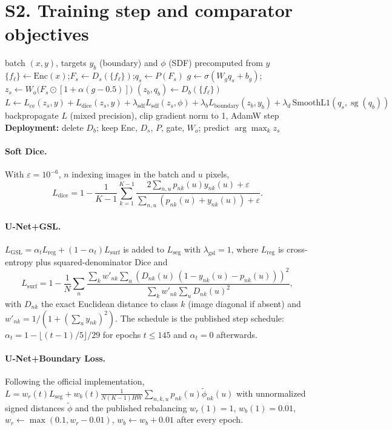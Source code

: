 \documentclass[10pt]{article}
\newcommand{\sg}{\operatorname{sg}}
\begin{document}
\section*{S2. Training step and comparator objectives}
\begin{algorithm}[ht]
\caption{BDS-Lite training step and deployment}
\begin{algorithmic}[1]
\Require batch $(x,y)$, targets $y_b$ (boundary) and $\phi$ (SDF) precomputed from $y$
\State $\{f_\ell\}\gets\mathrm{Enc}(x)$;\quad $F_s\gets D_s(\{f_\ell\})$;\quad $q_s\gets P(F_s)$
\State $g\gets\sigma(W_gq_s+b_g)$;\quad $z_s\gets W_o\bigl(F_s\odot[1+\alpha(g-0.5)]\bigr)$
\State $(z_b,q_b)\gets D_b(\{f_\ell\})$ 
\State $L\gets L_{\mathrm{ce}}(z_s,y)+L_{\mathrm{dice}}(z_s,y)+\lambda_{\mathrm{sdf}}L_{\mathrm{sdf}}(z_s,\phi)+\lambda_bL_{\mathrm{boundary}}(z_b,y_b)+\lambda_d\,\mathrm{SmoothL1}(q_s,\sg(q_b))$
\State backpropagate $L$ (mixed precision), clip gradient norm to 1, AdamW step
\State \textbf{Deployment:} delete $D_b$; keep Enc, $D_s$, $P$, gate, $W_o$; predict $\arg\max_k z_s$
\end{algorithmic}
\end{algorithm}

\paragraph{Soft Dice.} With $\varepsilon=10^{-6}$, $n$ indexing images in the batch and $u$ pixels,
\[
L_{\mathrm{dice}}=1-\frac{1}{K-1}\sum_{k=1}^{K-1}\frac{2\sum_{n,u}p_{nk}(u)y_{nk}(u)+\varepsilon}{\sum_{n,u}\left(p_{nk}(u)+y_{nk}(u)\right)+\varepsilon}.
\]

\paragraph{U-Net+GSL.} $L_{\mathrm{GSL}}=\alpha_tL_{\mathrm{reg}}+(1-\alpha_t)L_{\mathrm{surf}}$ is added to $L_{\mathrm{seg}}$ with $\lambda_{\mathrm{gsl}}=1$, where $L_{\mathrm{reg}}$ is cross-entropy plus squared-denominator Dice and
\[
L_{\mathrm{surf}}=1-\frac1N\sum_n\frac{\sum_kw'_{nk}\sum_u\left(D_{nk}(u)\,(1-y_{nk}(u)-p_{nk}(u))\right)^2}{\sum_kw'_{nk}\sum_uD_{nk}(u)^2},
\]
with $D_{nk}$ the exact Euclidean distance to class $k$ (image diagonal if absent) and $w'_{nk}=1/(1+(\sum_uy_{nk})^2)$. The schedule is the published step schedule: $\alpha_t=1-\lfloor(t-1)/5\rfloor/29$ for epochs $t\le145$ and $\alpha_t=0$ afterwards.

\paragraph{U-Net+Boundary Loss.} Following the official implementation, $L=w_r(t)L_{\mathrm{seg}}+w_b(t)\frac{1}{N(K-1)HW}\sum_{n,k,u}p_{nk}(u)\tilde\phi_{nk}(u)$ with unnormalized signed distances $\tilde\phi$ and the published rebalancing $w_r(1)=1$, $w_b(1)=0.01$, $w_r\leftarrow\max(0.1,w_r-0.01)$, $w_b\leftarrow w_b+0.01$ after every epoch.
\end{document}

